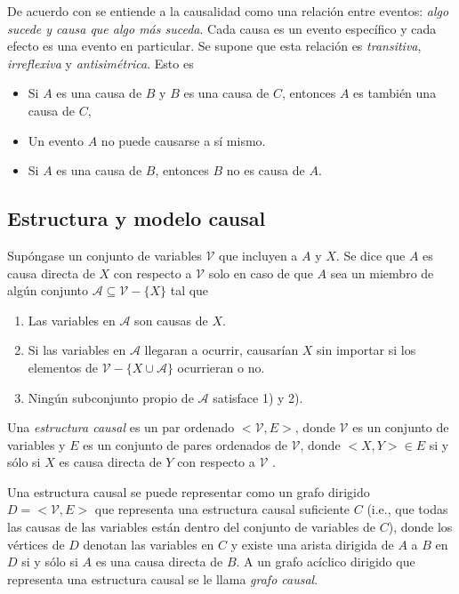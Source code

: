 De acuerdo con \cite{spirtes2000causation} se entiende a la causalidad 
como una relación entre eventos: \textit{algo sucede y causa que algo más suceda}. Cada causa es un evento específico y cada efecto es una evento
en particular. Se supone que esta relación es \textit{transitiva}, \textit{irreflexiva} y \textit{antisimétrica}. Esto es 
\begin{itemize}
    \item Si $A$ es una causa de $B$ y $B$ es una causa de $C$, entonces
    $A$ es también una causa de $C$,
    \item Un evento $A$ no puede causarse a sí mismo.
    \item Si $A$ es una causa de $B$, entonces $B$ no es causa de $A$.
\end{itemize}

\subsection{Estructura y modelo causal}

Supóngase un conjunto de variables $\mathcal{V}$ que incluyen a $A$ y $X$. 
Se dice que $A$ es causa directa de $X$ con respecto a $\mathcal{V}$
solo en caso de que $A$ sea un miembro de algún conjunto 
$\mathcal{A} \subseteq \mathcal{V} - \{X\}$ tal que 

\begin{enumerate}
    \item Las variables en $\mathcal{A}$ son causas de $X$.
    \item Si las variables en $\mathcal{A}$ llegaran a ocurrir,
    causarían $X$ sin importar si los elementos de $\mathcal{V} - \{X \cup \mathcal{A}\}$ ocurrieran o no.
    \item Ningún subconjunto propio de $\mathcal{A}$ satisface
    1) y 2).
\end{enumerate}

Una \textit{estructura causal} es un par ordenado $<\mathcal{V}, E>$, donde
$\mathcal{V}$ es un conjunto de variables y $E$ es un conjunto
de pares ordenados de $\mathcal{V}$, donde $<X, Y> \in E$ si
y sólo si $X$ es causa directa de $Y$ con respecto a  
$\mathcal{V}$ \cite{spirtes2000causation}.

Una estructura causal se puede representar como un grafo
dirigido $D = <\mathcal{V},E>$ que representa una estructura causal suficiente $C$ (i.e., que todas las causas de las variables están dentro del conjunto de variables de $C$), donde los vértices de $D$ denotan las variables en $C$ y existe una
arista dirigida de $A$ a $B$ en $D$ si y sólo si $A$ es
una causa directa de $B$.
A un grafo acíclico dirigido que representa una estructura causal se le llama \textit{grafo causal}.

